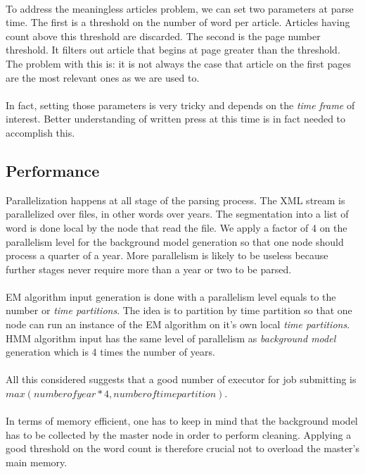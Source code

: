 \paragraph{}
To address the meaningless articles problem, we can set two parameters at parse time. The first is a threshold on the number of word per article. Articles having count above this threshold are discarded. The second is the page number threshold. It filters out article that begins at page greater than the threshold. The problem with this is: it is not always the case that article on the first pages are the most relevant ones as we are used to.

\paragraph{}
In fact, setting those parameters is very tricky and depends on the \emph{time frame} of interest. Better understanding of written press at this time is in fact needed to accomplish this.

\subsection{Performance}
Parallelization happens at all stage of the parsing process. The XML stream is parallelized over files, in other words over years. The segmentation into a list of word is done local by the node that read the file. We apply a factor of 4 on the parallelism level for the background model generation so that one node should process a quarter of a year. More parallelism is likely to be useless because further stages never require more than a year or two to be parsed.

\paragraph{}
EM algorithm input generation is done with a parallelism level equals to the number or \emph{time partitions}. The idea is to partition by time partition so that one node can run an instance of the EM algorithm on it's own local  \emph{time partitions}. HMM algorithm input has the same level of parallelism as \emph{background model} generation which is 4 times the number of years. 

\paragraph{}
All this considered suggests that a good number of executor for job submitting is $max(number of year*4, number of time partition)$.

\paragraph{}
In terms of memory efficient, one has to keep in mind that the background model has to be collected by the master node in order to perform cleaning. Applying a good threshold on the word count is therefore crucial not to overload the master's main memory.



